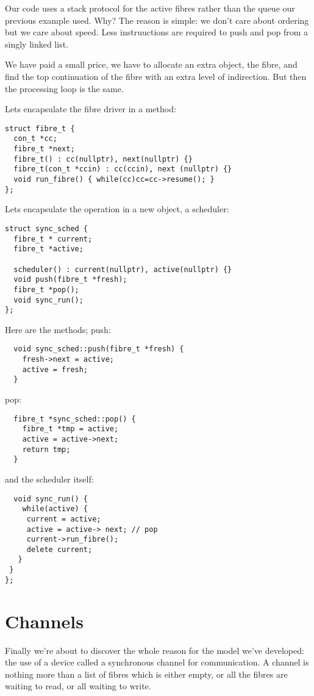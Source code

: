 \documentclass[oneside]{book}
\begin{document}
Our code uses a stack protocol for the active fibres rather than the
queue our previous example used. Why? The reason is simple: we don't
care about ordering but we care about speed. Less instruuctions are
required to push and pop from a singly linked list.  

We have paid a small price, we have to allocate an extra object, the fibre,
and find the top continuation of the fibre with an extra level of indirection.
But then the processing loop is the same. 

Lets encapsulate the fibre driver in a method:

\begin{verbatim}
struct fibre_t {
  con_t *cc;
  fibre_t *next;
  fibre_t() : cc(nullptr), next(nullptr) {}
  fibre_t(con_t *ccin) : cc(ccin), next (nullptr) {}
  void run_fibre() { while(cc)cc=cc->resume(); }
};
\end{verbatim}

Lets encapsulate the operation in a new object, a scheduler:

\begin{verbatim}
struct sync_sched {
  fibre_t * current;
  fibre_t *active;

  scheduler() : current(nullptr), active(nullptr) {}
  void push(fibre_t *fresh);
  fibre_t *pop();
  void sync_run();
};
\end{verbatim}

Here are the methods; push:

\begin{verbatim}
  void sync_sched::push(fibre_t *fresh) { 
    fresh->next = active; 
    active = fresh; 
  }
\end{verbatim}

pop:

\begin{verbatim}
  fibre_t *sync_sched::pop() {
    fibre_t *tmp = active;
    active = active->next;
    return tmp;
  }
\end{verbatim}

and the scheduler itself:

\begin{verbatim}
  void sync_run() {
    while(active) {
     current = active;
     active = active-> next; // pop
     current->run_fibre();
     delete current;
   }
 }
};
\end{verbatim}

\section{Channels}
Finally we're about to discover the whole reason for the model we've developed:
the use of a device called a synchronous channel for communication. A channel
is nothing more than a list of fibres which is either empty, or all the 
fibres are waiting to read, or all waiting to write.
\end{document}

